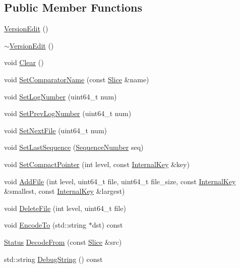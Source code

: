\subsection*{Public Member Functions}
\begin{DoxyCompactItemize}
\item 
\mbox{\hyperlink{classleveldb_1_1_version_edit_a60dd9c72d256ed1bda68597a9263333e}{Version\+Edit}} ()
\item 
\mbox{\hyperlink{classleveldb_1_1_version_edit_a8863bc7fa645c4bc2518910429447fbe}{$\sim$\+Version\+Edit}} ()
\item 
void \mbox{\hyperlink{classleveldb_1_1_version_edit_a259c9de14d58e231178904c1559e4b5e}{Clear}} ()
\item 
void \mbox{\hyperlink{classleveldb_1_1_version_edit_ab562147cdd82b184e86e88bd375a718c}{Set\+Comparator\+Name}} (const \mbox{\hyperlink{classleveldb_1_1_slice}{Slice}} \&name)
\item 
void \mbox{\hyperlink{classleveldb_1_1_version_edit_a47e5c58d34b0e27dc8990687e0c5477a}{Set\+Log\+Number}} (uint64\+\_\+t num)
\item 
void \mbox{\hyperlink{classleveldb_1_1_version_edit_ac1b5689f62e7a8f63c4eefa437a4f2f3}{Set\+Prev\+Log\+Number}} (uint64\+\_\+t num)
\item 
void \mbox{\hyperlink{classleveldb_1_1_version_edit_a4c104515adf573be0ead29e6835f14fb}{Set\+Next\+File}} (uint64\+\_\+t num)
\item 
void \mbox{\hyperlink{classleveldb_1_1_version_edit_abd6e841ed400672d33d26f4b187a66bf}{Set\+Last\+Sequence}} (\mbox{\hyperlink{namespaceleveldb_a5481ededd221c36d652c371249f869fa}{Sequence\+Number}} seq)
\item 
void \mbox{\hyperlink{classleveldb_1_1_version_edit_ac9b26dfba1188705d7fc4deaf047271c}{Set\+Compact\+Pointer}} (int level, const \mbox{\hyperlink{classleveldb_1_1_internal_key}{Internal\+Key}} \&key)
\item 
void \mbox{\hyperlink{classleveldb_1_1_version_edit_a4cd5cc92761b7ae5b5f9cff46cb88263}{Add\+File}} (int level, uint64\+\_\+t file, uint64\+\_\+t file\+\_\+size, const \mbox{\hyperlink{classleveldb_1_1_internal_key}{Internal\+Key}} \&smallest, const \mbox{\hyperlink{classleveldb_1_1_internal_key}{Internal\+Key}} \&largest)
\item 
void \mbox{\hyperlink{classleveldb_1_1_version_edit_ac222bfd1055114d57aadbd124f24ad0c}{Delete\+File}} (int level, uint64\+\_\+t file)
\item 
void \mbox{\hyperlink{classleveldb_1_1_version_edit_af95009ddc020f72a32a1aa805bcf3a91}{Encode\+To}} (std\+::string $\ast$dst) const
\item 
\mbox{\hyperlink{classleveldb_1_1_status}{Status}} \mbox{\hyperlink{classleveldb_1_1_version_edit_ac0f431c5e8f08c74c697d8480f7c005f}{Decode\+From}} (const \mbox{\hyperlink{classleveldb_1_1_slice}{Slice}} \&src)
\item 
std\+::string \mbox{\hyperlink{classleveldb_1_1_version_edit_a535f639edaa85da0d602b145528c6303}{Debug\+String}} () const
\end{DoxyCompactItemize}
